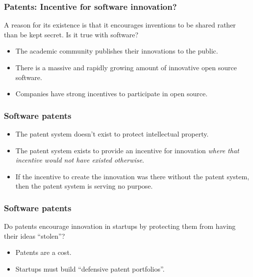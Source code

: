 \begin{frame}
\frametitle{Patents: Incentive for software innovation?}

A reason for its existence is that it encourages inventions to be shared rather than be kept secret. Is it true with software?

\pause

\begin{itemize}
\item The academic community publishes their innovations to the public.
\item There is a massive and rapidly growing amount of innovative open source software.
\item Companies have strong incentives to participate in open source.
\end{itemize}

\end{frame}


\begin{frame}
\frametitle{Software patents}

\begin{itemize}
\item The patent system doesn't exist to protect intellectual property.
\item The patent system exists to provide an incentive for innovation \textit{where that incentive would not have existed otherwise}.
\item If the incentive to create the innovation was there without the patent system, then the patent system is serving no purpose.
\end{itemize}

\end{frame}

\begin{frame}
\frametitle{Software patents}

Do patents encourage innovation in startups by protecting them from having their ideas ``stolen''?

\pause

\begin{itemize}
\item Patents are a cost.
\item Startups must build ``defensive patent portfolios''.
\end{itemize}

\end{frame}

